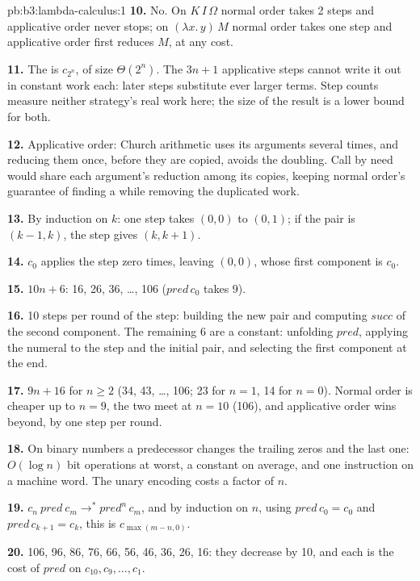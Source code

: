 \begin{solution}{pb:b3:lambda-calculus:1}
\textbf{10.} No. On $K\,I\,\Omega$ normal order takes 2 steps and applicative order never stops; on $(\lambda x.\,y)\,M$ normal order takes one step and applicative order first reduces $M$, at any cost.

\textbf{11.} The  is $c_{2^n}$, of size $\Theta(2^n)$. The $3n + 1$ applicative steps cannot write it out in constant work each: later steps substitute ever larger terms. Step counts measure neither strategy's real work here; the size of the result is a lower bound for both.

\textbf{12.} Applicative order: Church arithmetic uses its arguments several times, and reducing them once, before they are copied, avoids the doubling. Call by need would share each argument's reduction among its copies, keeping normal order's guarantee of finding a  while removing the duplicated work.

\textbf{13.} By induction on $k$: one step takes $(0, 0)$ to $(0, 1)$; if the pair is $(k - 1, k)$, the step gives $(k, k + 1)$.

\textbf{14.} $c_0$ applies the step zero times, leaving $(0, 0)$, whose first component is $c_0$.

\textbf{15.} $10n + 6$: 16, 26, 36, \dots, 106 ($\mathit{pred}\,c_0$ takes 9).

\textbf{16.} 10 steps per round of the step: building the new pair and computing $\mathit{succ}$ of the second component. The remaining 6 are a constant: unfolding $\mathit{pred}$, applying the numeral to the step and the initial pair, and selecting the first component at the end.

\textbf{17.} $9n + 16$ for $n \ge 2$ (34, 43, \dots, 106; 23 for $n = 1$, 14 for $n = 0$). Normal order is cheaper up to $n = 9$, the two meet at $n = 10$ (106), and applicative order wins beyond, by one step per round.

\textbf{18.} On binary numbers a predecessor changes the trailing zeros and the last one: $O(\log n)$ bit operations at worst, a constant on average, and one instruction on a machine word. The unary encoding costs a factor of $n$.

\textbf{19.} $c_n\ \mathit{pred}\ c_m \to^* \mathit{pred}^n\,c_m$, and by induction on $n$, using $\mathit{pred}\,c_0 = c_0$ and $\mathit{pred}\,c_{k+1} = c_k$, this is $c_{\max(m - n, 0)}$.

\textbf{20.} 106, 96, 86, 76, 66, 56, 46, 36, 26, 16: they decrease by 10, and each is the cost of $\mathit{pred}$ on $c_{10}, c_9, \dots, c_1$.


\end{solution}
